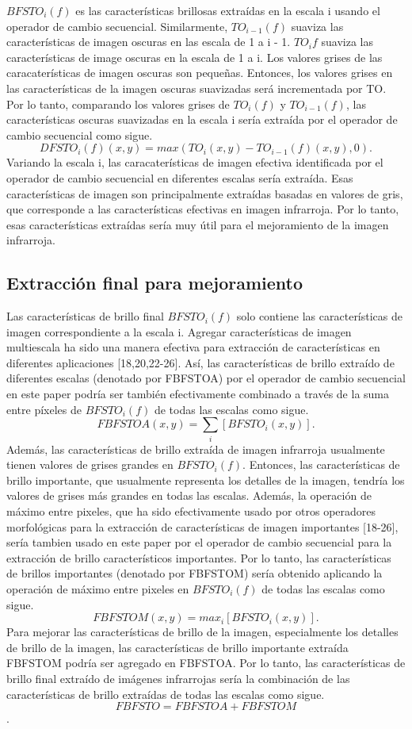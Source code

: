 \documentclass[a4paper, 11 pt, conference]{ieeeconf}      %
\begin{document}
$BFSTO_i(f)$ es las caracter\'isticas brillosas extra\'idas en la escala i usando el operador de cambio secuencial.
Similarmente, $TO_{i-1}(f) $ suaviza las caracter\'isticas de imagen oscuras en las escala de 1 a i - 1. $TO_i{f}$ suaviza las caracter\'isticas de image oscuras en la escala de 1 a i. Los valores grises de las caracater\'isticas de imagen oscuras son pequeñas. Entonces, los valores grises en las caracter\'isticas de la imagen oscuras suavizadas ser\'a incrementada por TO. Por lo tanto, comparando los valores grises de $TO_i(f)$ y $TO_{i-1}(f)$, las caracter\'isticas oscuras suavizadas en la escala i ser\'ia extra\'ida por el operador de cambio secuencial como sigue.
$$
DFSTO_i(f)(x,y) = max(TO_i(x,y) - TO_{i-1}(f)(x,y),0).
$$
Variando la escala i, las caracater\'isticas de imagen efectiva identificada por el operador de cambio secuencial en diferentes escalas ser\'ia extra\'ida. Esas caracter\'isticas de imagen son principalmente extra\'idas basadas en valores de gris, que corresponde a las caracter\'isticas efectivas en imagen infrarroja. Por lo tanto, esas caracter\'isticas extra\'idas ser\'ia muy \'util para el mejoramiento de la imagen infrarroja.

\subsection{Extracci\'on final para mejoramiento}
Las caracter\'isticas de brillo final $BFSTO_i(f)$ solo contiene las caracter\'isticas de imagen correspondiente a la escala i. Agregar  caracter\'isticas de imagen multiescala ha sido una manera efectiva para extracci\'on de caracter\'isticas en diferentes aplicaciones [18,20,22-26]. As\'i, las caracter\'isticas de brillo extra\'ido de diferentes escalas (denotado por FBFSTOA) por el operador de cambio secuencial en este paper podr\'ia ser tambi\'en efectivamente combinado a trav\'es de la suma entre p\'ixeles de $BFSTO_i(f)$ de todas las escalas como sigue.
$$
FBFSTOA(x,y) = \sum_{i} [BFSTO_i(x,y)].
$$
Adem\'as, las caracter\'isticas de brillo extra\'ida de imagen infrarroja usualmente tienen valores de grises grandes en $BFSTO_i(f)$. Entonces, las caracter\'isticas de brillo importante, que usualmente representa los detalles de la imagen, tendr\'ia los valores de grises m\'as grandes en todas las escalas. Adem\'as, la operaci\'on de m\'aximo entre pixeles, que ha sido efectivamente usado por otros operadores morfol\'ogicas para la extracci\'on de caracter\'isticas de imagen importantes [18-26], ser\'ia tambien usado en este paper por el operador de cambio secuencial para la extracci\'on de brillo caracter\'isticos importantes. Por lo tanto, las caracter\'isticas de brillos importantes (denotado por FBFSTOM) ser\'ia obtenido aplicando la operaci\'on de m\'aximo entre pixeles en $BFSTO_i(f)$ de todas las escalas como sigue.
$$
FBFSTOM(x,y) = max_i[BFSTO_i(x,y)].
$$
Para mejorar las caracter\'isticas de brillo de la imagen, especialmente los detalles de brillo de la imagen, las caracter\'isticas de brillo importante extra\'ida FBFSTOM podr\'ia ser agregado en FBFSTOA. Por lo tanto, las caracter\'isticas de brillo final extra\'ido de im\'agenes infrarrojas ser\'ia la combinaci\'on de las caracter\'isticas de brillo extra\'idas de todas las escalas como sigue.
$$FBFSTO = FBFSTOA + FBFSTOM$$.
\end{document}
